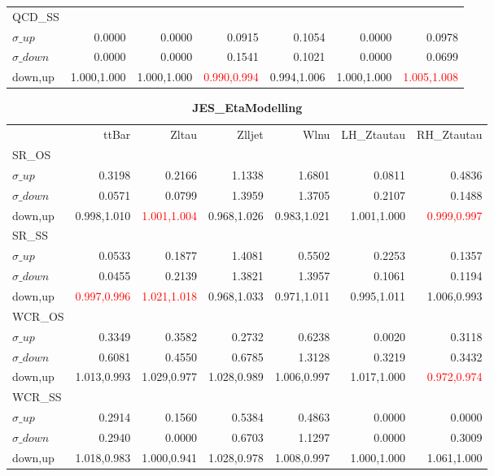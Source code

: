\documentclass[11pt,oneside,a4paper]{article}
\begin{document}
\begin{table}
\begin{tabular}{lrrrrrr}
\hline
QCD\_SS &  &  &  &  &  &  \\
$\sigma\_up$ & 0.0000 & 0.0000 & 0.0915 & 0.1054 & 0.0000 & 0.0978 \\
$\sigma\_down$ & 0.0000 & 0.0000 & 0.1541 & 0.1021 & 0.0000 & 0.0699 \\
down,up & 1.000,1.000 & 1.000,1.000 & \textcolor{red}{0.990,0.994} & 0.994,1.006 & 1.000,1.000 & \textcolor{red}{1.005,1.008} \\

\hline
\end{tabular}
\end{table}
\begin{table}
\centering
\caption{\bf{JES\_EtaModelling}}
\begin{tabular}{lrrrrrr}
 & ttBar & Zltau & Zlljet & Wlnu & LH\_Ztautau & RH\_Ztautau \\
SR\_OS &  &  &  &  &  &  \\
$\sigma\_up$ & 0.3198 & 0.2166 & 1.1338 & 1.6801 & 0.0811 & 0.4836 \\
$\sigma\_down$ & 0.0571 & 0.0799 & 1.3959 & 1.3705 & 0.2107 & 0.1488 \\
down,up & 0.998,1.010 & \textcolor{red}{1.001,1.004} & 0.968,1.026 & 0.983,1.021 & 1.001,1.000 & \textcolor{red}{0.999,0.997} \\

\hline
SR\_SS &  &  &  &  &  &  \\
$\sigma\_up$ & 0.0533 & 0.1877 & 1.4081 & 0.5502 & 0.2253 & 0.1357 \\
$\sigma\_down$ & 0.0455 & 0.2139 & 1.3821 & 1.3957 & 0.1061 & 0.1194 \\
down,up & \textcolor{red}{0.997,0.996} & \textcolor{red}{1.021,1.018} & 0.968,1.033 & 0.971,1.011 & 0.995,1.011 & 1.006,0.993 \\

\hline
WCR\_OS &  &  &  &  &  &  \\
$\sigma\_up$ & 0.3349 & 0.3582 & 0.2732 & 0.6238 & 0.0020 & 0.3118 \\
$\sigma\_down$ & 0.6081 & 0.4550 & 0.6785 & 1.3128 & 0.3219 & 0.3432 \\
down,up & 1.013,0.993 & 1.029,0.977 & 1.028,0.989 & 1.006,0.997 & 1.017,1.000 & \textcolor{red}{0.972,0.974} \\

\hline
WCR\_SS &  &  &  &  &  &  \\
$\sigma\_up$ & 0.2914 & 0.1560 & 0.5384 & 0.4863 & 0.0000 & 0.0000 \\
$\sigma\_down$ & 0.2940 & 0.0000 & 0.6703 & 1.1297 & 0.0000 & 0.3009 \\
down,up & 1.018,0.983 & 1.000,0.941 & 1.028,0.978 & 1.008,0.997 & 1.000,1.000 & 1.061,1.000 \\


\end{tabular}
\end{table}
\end{document}
